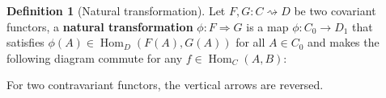 \documentclass{scrartcl}
\theoremstyle{definition}
\newtheorem{defn}[thm]{Definition}
\theoremstyle{remark}
\DeclareMathOperator{\Hom}{Hom}
\begin{document}
\begin{defn}[Natural transformation]\label{defnattran}
Let $F,G : C \rightsquigarrow D$ be two covariant functors, a \textbf{natural transformation} $\phi: F \Rightarrow G$ is a map $\phi: C_0 \rightarrow D_1$ that satisfies $\phi(A) \in \Hom_D(F(A), G(A))$ for all $A \in C_0$ and makes the following diagram commute for any $f \in \Hom_C(A,B)$:
\begin{figure}[H]
    \centering
\end{figure}
For two contravariant functors, the vertical arrows are reversed.
\end{defn}
\end{document}
